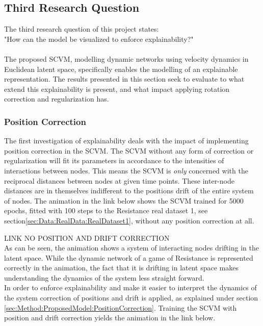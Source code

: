 \subsection{Third Research Question}
\label{sec:ResearchQuestion3}
The third research question of this project states:
\\
"How can the model be visualized to enforce explainability?"
\\\\
The proposed SCVM, modelling dynamic networks using velocity dynamics in Euclidean latent space, specifically enables the modelling of an explainable representation.
The results presented in this section seek to evaluate to what extend this explainability is present, and what impact applying rotation correction and regularization has.


\subsubsection{Position Correction}
\label{sec:ResearchQuestion3:PositionCorrection}
The first investigation of explainability deals with the impact of implementing position correction in the SCVM.
The SCVM without any form of correction or regularization will fit its parameters in accordance to the intensities of interactions between nodes.
This means the SCVM is \textit{only} concerned with the reciprocal distances between nodes at given time points.
These inter-node distances are in themselves indifferent to the positions drift of the entire system of nodes.
The animation in the link below shows the SCVM trained for 5000 epochs, fitted with 100 steps to the Resistance real dataset 1, see section\ref{sec:Data:RealData:RealDataset1}, without any position correction at all.

LINK NO POSITION AND DRIFT CORRECTION
\\
\noindent
As can be seen, the animation shows a system of interacting nodes drifting in the latent space.
While the dynamic network of a game of Resistance is represented correctly in the animation, the fact that it is drifting in latent space makes understanding the dynamics of the system less straight forward.
\\
In order to enforce explainability and make it easier to interpret the dynamics of the system correction of positions and drift is applied, as explained under section \ref{sec:Method:ProposedModel:PositionCorrection}.
Training the SCVM with position and drift correction yields the animation in the link below.

